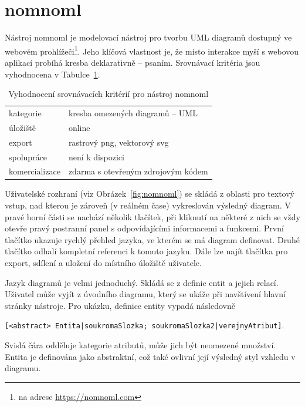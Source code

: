 \section{nomnoml}

Nástroj nomnoml je modelovací nástroj pro tvorbu UML diagramů dostupný ve webovém prohlížeči\footnote{na adrese \url{https://nomnoml.com}}.
Jeho klíčová vlastnost je, že místo interakce myší s webovou aplikací probíhá kresba deklarativně -- psaním.
Srovnávací kritéria jsou vyhodnocena v Tabulce~\ref{tab:comparison-nomnoml}.

\begin{table}[!htb]
  \begin{tabularx}{\textwidth}{lX}\toprule
    kategorie      & kresba omezených diagramů -- UML                  \\
    úložiště       & online                                            \\
    export         & rastrový \acrshort{png}, vektorový \acrshort{svg} \\
    spolupráce     & není k dispozici                                  \\
    komercializace & zdarma s otevřeným zdrojovým kódem
    \\\bottomrule
  \end{tabularx}
  \caption{Vyhodnocení srovnávacích kritérií pro nástroj nomnoml}
  \label{tab:comparison-nomnoml}
\end{table}

Uživatelské rozhraní (viz Obrázek~\ref{fig:nomnoml}) se skládá z oblasti pro textový vstup, nad kterou je zároveň (v reálném čase) vykreslován výsledný diagram.
V pravé horní části se nachází několik tlačítek, při kliknutí na některé z nich se vždy otevře pravý postranní panel s odpovídajícími informacemi a funkcemi.
První tlačítko ukazuje rychlý přehled jazyka, ve kterém se má diagram definovat.
Druhé tlačítko odhalí kompletní referenci k tomuto jazyku.
Dále lze najít tlačítka pro export, sdílení a uložení do místního úložiště uživatele.

Jazyk diagramů je velmi jednoduchý.
Skládá se z definic entit a jejich relací.
Uživatel může vyjít z úvodního diagramu, který se ukáže při navštívení hlavní stránky nástroje.
Pro ukázku, definice entity vypadá následovně

\noindent\texttt{[<abstract> Entita|soukromaSlozka; soukromaSlozka2|verejnyAtribut]}.

Svislá čára odděluje kategorie atributů, může jich být neomezené množství.
Entita je definována jako abstraktní, což také ovlivní její výsledný styl vzhledu v diagramu.

